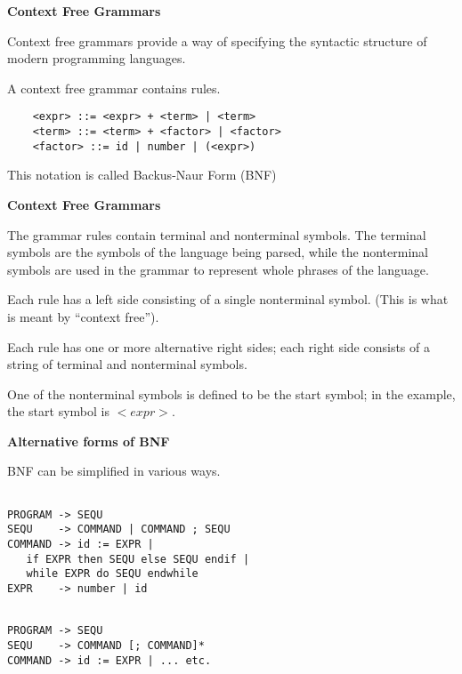 %
\begin{slide}{}
{\bf Context Free Grammars}

Context free grammars provide a way of specifying the syntactic
structure of modern programming languages.

A context free grammar contains rules.

{\small
\begin{verbatim}
    <expr> ::= <expr> + <term> | <term>
    <term> ::= <term> + <factor> | <factor>
    <factor> ::= id | number | (<expr>)
\end{verbatim}
}

This notation is called Backus-Naur Form (BNF)
\end{slide}
%
%
\begin{slide}{}
{\bf Context Free Grammars}

The grammar rules contain terminal and nonterminal symbols.
The terminal symbols are the symbols of the language being parsed, while
the nonterminal symbols are used in the grammar to represent whole phrases
of the language.

Each rule has a left side consisting of a single nonterminal symbol.
(This is what is meant by ``context free'').

Each rule has one or more alternative right sides; each right side
consists of a string of terminal and nonterminal symbols.

One of the nonterminal symbols is defined to be the start symbol; in the
example, the start symbol is {\tt $<expr>$}.

\end{slide}
%
%
\begin{slide}{}
{\bf Alternative forms of BNF}

BNF can be simplified in various ways.
\begin{verbatim}

PROGRAM -> SEQU
SEQU    -> COMMAND | COMMAND ; SEQU
COMMAND -> id := EXPR |
   if EXPR then SEQU else SEQU endif |
   while EXPR do SEQU endwhile
EXPR    -> number | id

\end{verbatim}
\begin{verbatim}

PROGRAM -> SEQU
SEQU    -> COMMAND [; COMMAND]*
COMMAND -> id := EXPR | ... etc.

\end{verbatim}

\end{slide}


